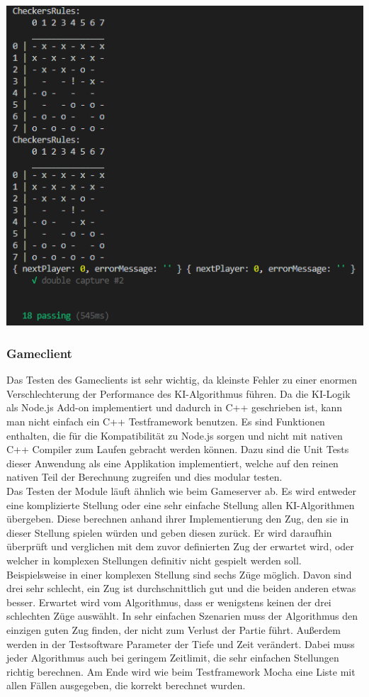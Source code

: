 \documentclass[12pt,a4paper,bibliography=totocnumbered,listof=totocnumbered]{article}
\begin{document}
\vspace{1em}
\begin{minipage}{\linewidth}
	\centering
	\includegraphics[width=0.6\linewidth]{pics/UnitTestResult.png}
	\label{fig:UnitTestResult}
\end{minipage}

\subsubsection{Gameclient}
Das Testen des Gameclients ist sehr wichtig, da kleinste Fehler zu einer enormen Verschlechterung der Performance des KI-Algorithmus führen.
Da die KI-Logik als Node.js Add-on implementiert und dadurch in C++ geschrieben ist, kann man nicht einfach ein C++ Testframework benutzen. 
Es sind Funktionen enthalten, die für die Kompatibilität zu Node.js sorgen und nicht mit nativen C++ Compiler zum Laufen gebracht werden können.
Dazu sind die Unit Tests dieser Anwendung als eine Applikation implementiert, welche auf den reinen nativen Teil der Berechnung zugreifen und 
dies modular testen. 
\\
Das Testen der Module läuft ähnlich wie beim Gameserver ab. Es wird entweder eine komplizierte Stellung oder eine sehr einfache Stellung 
allen KI-Algorithmen übergeben. Diese berechnen anhand ihrer Implementierung den Zug, den sie in dieser Stellung spielen würden und
geben diesen zurück. Er wird daraufhin überprüft und verglichen mit dem zuvor definierten Zug der erwartet wird, oder welcher in 
komplexen Stellungen definitiv nicht gespielt werden soll. Beispielsweise in einer komplexen Stellung sind sechs Züge möglich. Davon sind drei sehr schlecht,
ein Zug ist durchschnittlich gut und die beiden anderen etwas besser. Erwartet wird vom Algorithmus, dass er wenigstens keinen der drei schlechten Züge
auswählt. In sehr einfachen Szenarien muss der Algorithmus den einzigen guten Zug finden, der nicht zum Verlust der Partie führt. 
Außerdem werden in der Testsoftware Parameter der Tiefe und Zeit verändert. Dabei muss jeder Algorithmus auch bei geringem Zeitlimit, die sehr einfachen
Stellungen richtig berechnen. Am Ende wird wie beim Testframework Mocha eine Liste mit allen Fällen ausgegeben, die korrekt berechnet wurden.
\end{document}

